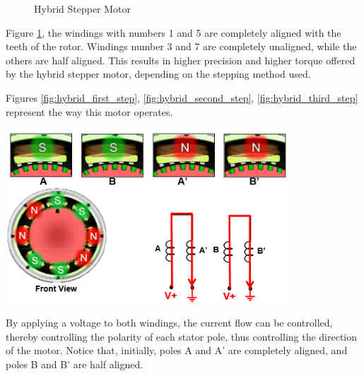 \begin{figure}[htp]
    \centering%
    \hfill%
    \caption{Hybrid Stepper Motor}
    \label{fig:stepper}
\end{figure}
\newpage
Figure \ref{fig:stepper}, the windings with numbers 1 and 5 are completely aligned with the teeth of the rotor. Windings number 3 and 7 are completely unaligned, while the others are half aligned. This results in higher precision and higher torque offered by the hybrid stepper motor, depending on the stepping method used.

Figures \ref{fig:hybrid_first_step},  \ref{fig:hybrid_second_step}, \ref{fig:hybrid_third_step} represent the way this motor operates.

\begin{center}
	\includegraphics[width=0.8\textwidth]{figures/move/motor32}
	\label{fig:hybrid_first_step}
\end{center}
\newpage
By applying a voltage to both windings, the current flow can be controlled, thereby controlling the polarity of each stator pole, thus controlling the direction of the motor. Notice that, initially, poles A and A’ are completely aligned, and poles B and B’ are half aligned. 

